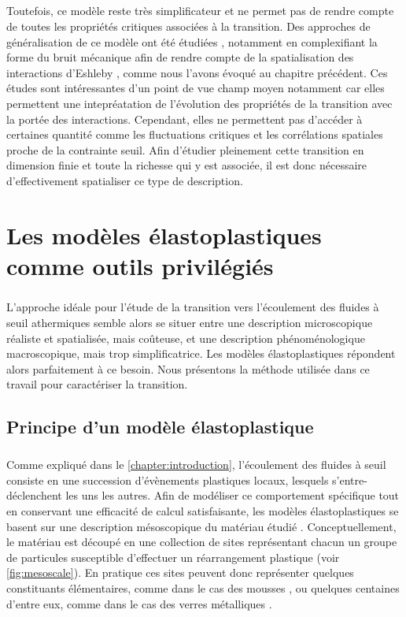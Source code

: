 \subparagraph{}Toutefois, ce modèle reste très simplificateur et ne permet pas de rendre compte de toutes les propriétés critiques associées à la transition. Des approches de généralisation de ce modèle ont été étudiées \cite{agoritsas_relevance_2015, bouchaud_spontaneous_2016}, notamment en complexifiant la forme du bruit mécanique afin de rendre compte de la spatialisation des interactions d'Eshleby \cite{lin_mean-field_2016, lin_microscopic_2018}, comme nous l'avons évoqué au chapitre précédent. Ces études sont intéressantes d'un point de vue champ moyen notamment car elles permettent une intepréatation de l'évolution des propriétés de la transition avec la portée des interactions. Cependant, elles ne permettent pas d'accéder à certaines quantité comme les fluctuations critiques et les corrélations spatiales proche de la contrainte seuil. Afin d'étudier pleinement cette transition en dimension finie et toute la richesse qui y est associée, il est donc nécessaire d'effectivement spatialiser ce type de description. 

\section{Les modèles élastoplastiques comme outils privilégiés}

\subparagraph{}L'approche idéale pour l'étude de la transition vers l'écoulement des fluides à seuil athermiques semble alors se situer entre une description microscopique réaliste et spatialisée, mais coûteuse, et une description phénoménologique macroscopique, mais trop simplificatrice. Les modèles élastoplastiques répondent alors parfaitement à ce besoin. Nous présentons la méthode utilisée dans ce travail pour caractériser la transition.

\subsection{Principe d'un modèle élastoplastique}

\subparagraph{}Comme expliqué dans le \autoref{chapter:introduction}, l'écoulement des fluides à seuil consiste en une succession d'évènements plastiques locaux, lesquels s'entre-déclenchent les uns les autres. Afin de modéliser ce comportement spécifique tout en conservant une efficacité de calcul satisfaisante, les modèles élastoplastiques se basent sur une description mésoscopique du matériau étudié \cite{nicolas_deformation_2018}. Conceptuellement, le matériau est découpé en une collection de sites représentant chacun un groupe de particules susceptible d'effectuer un réarrangement plastique (voir \autoref{fig:mesoscale}). En pratique ces sites peuvent donc représenter quelques constituants élémentaires, comme dans le cas des mousses \cite{schott_multiscale_2024}, ou quelques centaines d'entre eux, comme dans le cas des verres métalliques \cite{pan_experimental_2008}.

